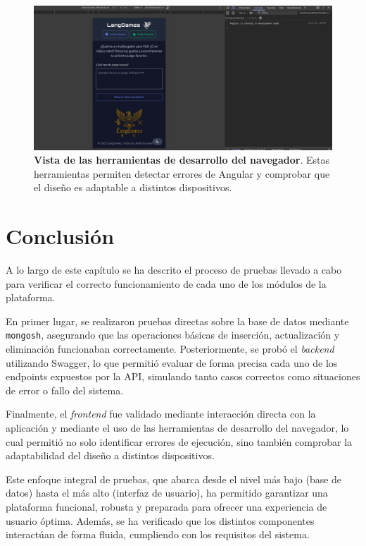 \begin{figure}[H]
	\centering
	\includegraphics[width=1\linewidth]{imagenes/consolaNavegador.png}
	\caption[\textbf{Vista de las herramientas de desarrollo del navegador}.]{\textbf{Vista de las herramientas de desarrollo del navegador}. Estas herramientas permiten detectar errores de Angular y comprobar que el diseño es adaptable a distintos dispositivos.}
	\label{consola-navegador}
\end{figure}

\newpage

\section{Conclusión}

A lo largo de este capítulo se ha descrito el proceso de pruebas llevado a cabo para verificar el correcto funcionamiento de cada uno de los módulos de la plataforma.

En primer lugar, se realizaron pruebas directas sobre la base de datos mediante \texttt{mongosh}, asegurando que las operaciones básicas de inserción, actualización y eliminación funcionaban correctamente. Posteriormente, se probó el \textit{backend} utilizando Swagger, lo que permitió evaluar de forma precisa cada uno de los endpoints expuestos por la API, simulando tanto casos correctos como situaciones de error o fallo del sistema.

Finalmente, el \textit{frontend} fue validado mediante interacción directa con la aplicación y mediante el uso de las herramientas de desarrollo del navegador, lo cual permitió no solo identificar errores de ejecución, sino también comprobar la adaptabilidad del diseño a distintos dispositivos.

Este enfoque integral de pruebas, que abarca desde el nivel más bajo (base de datos) hasta el más alto (interfaz de usuario), ha permitido garantizar una plataforma funcional, robusta y preparada para ofrecer una experiencia de usuario óptima. Además, se ha verificado que los distintos componentes interactúan de forma fluida, cumpliendo con los requisitos del sistema.

